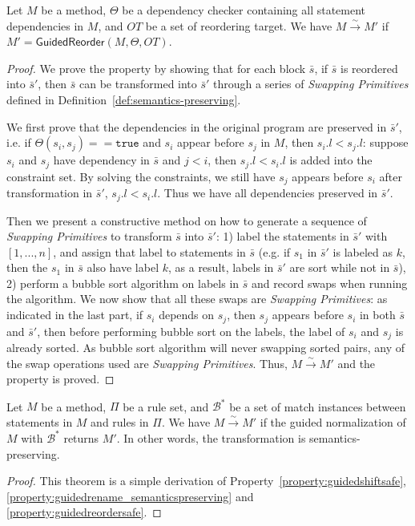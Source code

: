 \documentclass[letterpaper, USenglish]{lipics-v2016}
\theoremstyle{plain}
\begin{document}
\begin{prop} 
  Let $M$ be a method, $\Theta$ be a dependency checker containing all
  statement dependencies in $M$, and $\mathit{OT}$ be a set of
  reordering target. We have $M\xrightarrow{\sim}M'$ if $M'=\mathsf{GuidedReorder}(M, \Theta, \mathit{OT})$. 
\end{prop}
\begin{proof}
We prove the property by showing that for each block $\bar{s}$, if $\bar{s}$ is reordered into $\bar{s}'$, then $\bar{s}$ can be transformed into $\bar{s}'$ through a series of \emph{Swapping Primitives} defined in Definition~\ref{def:semantics-preserving}.

We first prove that the dependencies in the original program are preserved in $\bar{s}'$, i.e. if $\Theta(s_i,s_j)==\mathtt{true}$ and $s_i$ appear before $s_j$ in $M$, then $s_i.l < s_j.l$: suppose $s_i$ and $s_j$ have dependency in $\bar{s}$ and $j < i$, then $s_j.l < s_i.l$ is added into the constraint set. By solving the constraints, we still have $s_j$ appears before $s_i$ after transformation in $\bar{s}'$, $s_j.l < s_i.l$. Thus we have all dependencies preserved in $\bar{s}'$.

Then we present a constructive method on how to generate a sequence of \emph{Swapping Primitives} to transform $\bar{s}$ into $\bar{s}'$: 1) label the statements in $\bar{s}'$ with $[1,...,n]$, and assign that label to statements in $\bar{s}$ (e.g. if $s_1$ in $\bar{s}'$ is labeled as $k$, then the $s_1$ in $\bar{s}$ also have label $k$, as a result, labels in $\bar{s}'$ are sort while not in $\bar{s}$), 2) perform a bubble sort algorithm on labels in $\bar{s}$ and record swaps when running the algorithm. We now show that all these swaps are \emph{Swapping Primitives}: as indicated in the last part, if $s_i$ depends on $s_j$, then $s_j$ appears before $s_i$ in both $\bar{s}$ and $\bar{s}'$, then before performing bubble sort on the labels, the label of $s_i$ and $s_j$ is already sorted. As bubble sort algorithm will never swapping sorted pairs, any of the swap operations used are \emph{Swapping Primitives}. Thus, $M\xrightarrow{\sim}M'$ and the property is proved.
\end{proof}

\begin{thm} Let $M$ be a method, $\Pi$ be a rule
  set, and $\mathcal{B}^*$ be a set of match instances between
  statements in $M$ and rules in $\Pi$. We have $M\xrightarrow{\sim}
  M'$ if the guided normalization of $M$ with $\mathcal{B}^*$ returns
  $M'$. In other words, the transformation is semantics-preserving.
\end{thm}
\begin{proof} This theorem is a simple derivation of
  Property~\ref{property:guidedshiftsafe}, \ref{property:guidedrename_semanticspreserving} and \ref{property:guidedreordersafe}.
\end{proof}
\end{document}
